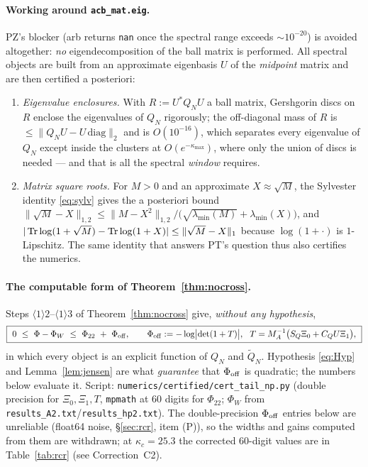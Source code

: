 \documentclass[11pt]{article}
\begin{document}
\paragraph{Working around \texttt{acb\_mat.eig}.}  PZ's blocker (arb returns \texttt{nan} once the
spectral range exceeds $\sim10^{-20}$) is avoided altogether: \emph{no} eigendecomposition of the
ball matrix is performed.  All spectral objects are built from an approximate eigenbasis $U$ of the
\emph{midpoint} matrix and are then certified a posteriori:
\begin{enumerate}[label=(\roman*),leftmargin=1.8em]
\item \emph{Eigenvalue enclosures.}  With $R:=U^*Q_NU$ a ball matrix, Gershgorin discs on $R$ enclose
 the eigenvalues of $Q_N$ rigorously; the off-diagonal mass of $R$ is $\le\|Q_NU-U\,\mathrm{diag}\|_2$
 and is $O(10^{-16})$, which separates every eigenvalue of $Q_N$ except inside the clusters at
 $O(e^{-\kappa_{\max}})$, where only the union of discs is needed --- and that is all the spectral
 \emph{window} requires.
\item \emph{Matrix square roots.}  For $M>0$ and an approximate $X\approx\sqrt M$, the Sylvester
 identity \eqref{eq:sylv} gives the a posteriori bound
 $\|\sqrt M-X\|_{1,2}\le\|M-X^2\|_{1,2}\big/\bigl(\sqrt{\lambda_{\min}(M)}+\lambda_{\min}(X)\bigr)$,
 and $|\operatorname{Tr}\log(1+\sqrt M)-\operatorname{Tr}\log(1+X)|\le\|\sqrt M-X\|_1$ because $\log(1+\cdot)$ is $1$-Lipschitz.
 The same identity that answers PT's question thus also certifies the numerics.
\end{enumerate}

\paragraph{The computable form of Theorem~\ref{thm:nocross}.}  Steps
$\langle1\rangle2$--$\langle1\rangle3$ of Theorem~\ref{thm:nocross} give, \emph{without any
hypothesis},
\begin{equation}\label{eq:computable}
 \boxed{\ 0\ \le\ \Phi-\Phi_W\ \le\ \Phi_{22}\ +\ \Phi_{\rm off},\qquad
 \Phi_{\rm off}:=-\log\bigl|\det(1+T)\bigr|,\ \ T=M_A^{-1}\bigl(S_Q\Xi_0+C_QU\Xi_1\bigr),\ }
\end{equation}
in which every object is an explicit function of $Q_N$ and $\widetilde Q_N$.  Hypothesis \eqref{eq:Hyp}
and Lemma~\ref{lem:jensen} are what \emph{guarantee} that $\Phi_{\rm off}$ is quadratic; the numbers
below evaluate it.  Script: \texttt{numerics/certified/cert\_tail\_np.py} (double precision for
$\Xi_0,\Xi_1,T$, \texttt{mpmath} at $60$ digits for $\Phi_{22}$; $\Phi_W$ from
\texttt{results\_A2.txt}/\texttt{results\_hp2.txt}).  The double-precision $\Phi_{\rm off}$ entries below are unreliable (float64 noise, \S\ref{sec:rcr}, item (P)), so the widths and gains computed from them are withdrawn; at $\kappa_c=25.3$ the corrected $60$-digit values are in Table~\ref{tab:rcr} (see Correction~C2).
\end{document}
